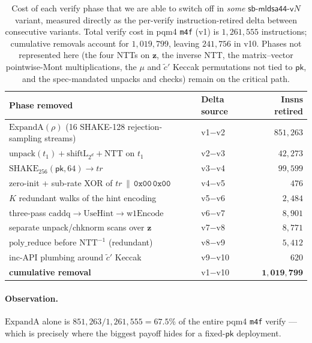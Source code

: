 \documentclass[11pt,a4paper]{article}
\newcommand{\NTT}{\mathrm{NTT}}
\newcommand{\iNTT}{\mathrm{NTT}^{-1}}
\newcommand{\UseHint}{\mathrm{UseHint}}
\newcommand{\ExpandA}{\mathrm{ExpandA}}
\newcommand{\SHAKE}{\mathrm{SHAKE}}
\begin{document}
\begin{table}[ht]
\centering
\caption{Cost of each verify phase that we are able to switch off in
\emph{some} $\textsf{sb-mldsa44-v}N$ variant, measured directly as the
per-verify instruction-retired delta between consecutive variants. Total
verify cost in pqm4 \texttt{m4f} (\textsf{v1}) is $1{,}261{,}555$
instructions; cumulative removals account for $1{,}019{,}799$, leaving
$241{,}756$ in \textsf{v10}. Phases not represented here (the four NTTs
on $\mathbf{z}$, the inverse NTT, the matrix--vector pointwise-Mont
multiplications, the $\mu$ and $\tilde c'$ Keccak permutations not tied
to $\textsf{pk}$, and the spec-mandated unpacks and checks) remain on
the critical path.}
\label{tab:cost-breakdown}
\begin{tabular}{l l r}
\toprule
Phase removed                                       & Delta source     & Insns retired \\
\midrule
$\ExpandA(\rho)$ (16 SHAKE-128 rejection-sampling streams) & \textsf{v1}$-$\textsf{v2} & $851{,}263$ \\
$\mathrm{unpack}(t_1) + \mathrm{shiftL}_{2^d} + \NTT$ on $t_1$ & \textsf{v2}$-$\textsf{v3} & $42{,}273$ \\
$\SHAKE_{256}(\textsf{pk}, 64) \to tr$              & \textsf{v3}$-$\textsf{v4}     & $99{,}599$ \\
zero-init + sub-rate XOR of $tr \,\|\, \mathtt{0x00\,0x00}$ & \textsf{v4}$-$\textsf{v5}     & $476$ \\
$K$ redundant walks of the hint encoding             & \textsf{v5}$-$\textsf{v6}     & $2{,}484$ \\
three-pass $\mathrm{caddq}\to\UseHint\to\mathrm{w1Encode}$ & \textsf{v6}$-$\textsf{v7}     & $8{,}901$ \\
separate unpack/chknorm scans over $\mathbf{z}$      & \textsf{v7}$-$\textsf{v8}     & $8{,}771$ \\
$\mathrm{poly\_reduce}$ before $\iNTT$ (redundant)  & \textsf{v8}$-$\textsf{v9}     & $5{,}412$ \\
inc-API plumbing around $\tilde c'$ Keccak           & \textsf{v9}$-$\textsf{v10}    & $620$ \\
\midrule
\textbf{cumulative removal}                          & \textsf{v1}$-$\textsf{v10}    & $\mathbf{1{,}019{,}799}$ \\
\bottomrule
\end{tabular}
\end{table}

\paragraph{Observation.} $\ExpandA$ alone is $851{,}263 / 1{,}261{,}555 =
67.5\%$ of the entire pqm4 \texttt{m4f} verify --- which is precisely
where the biggest payoff hides for a fixed-$\textsf{pk}$ deployment.
\end{document}
